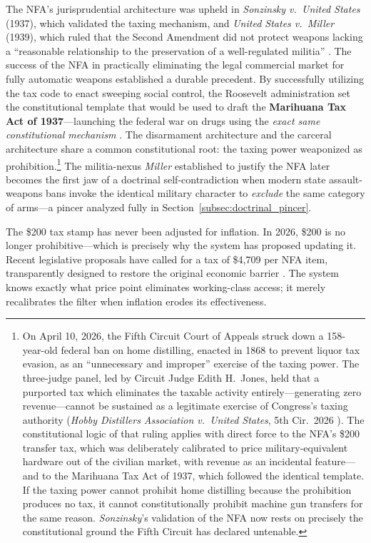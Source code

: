 The NFA's jurisprudential architecture was upheld in \textit{Sonzinsky v.\ United States} (1937), which validated the taxing mechanism, and \textit{United States v.\ Miller} (1939), which ruled that the Second Amendment did not protect weapons lacking a ``reasonable relationship to the preservation of a well-regulated militia'' \cite{dickinson_nfa, ebsco_nfa}. The success of the NFA in practically eliminating the legal commercial market for fully automatic weapons established a durable precedent. By successfully utilizing the tax code to enact sweeping social control, the Roosevelt administration set the constitutional template that would be used to draft the \textbf{Marihuana Tax Act of 1937}---launching the federal war on drugs using the \textit{exact same constitutional mechanism} \cite{cato_prohibition}. The disarmament architecture and the carceral architecture share a common constitutional root: the taxing power weaponized as prohibition.\footnote{On April 10, 2026, the Fifth Circuit Court of Appeals struck down a 158-year-old federal ban on home distilling, enacted in 1868 to prevent liquor tax evasion, as an ``unnecessary and improper'' exercise of the taxing power. The three-judge panel, led by Circuit Judge Edith H.\ Jones, held that a purported tax which eliminates the taxable activity entirely---generating zero revenue---cannot be sustained as a legitimate exercise of Congress's taxing authority (\textit{Hobby Distillers Association v.\ United States}, 5th Cir.\ 2026 \cite{hobby_distillers_2026}). The constitutional logic of that ruling applies with direct force to the NFA's \$200 transfer tax, which was deliberately calibrated to price military-equivalent hardware out of the civilian market, with revenue as an incidental feature---and to the Marihuana Tax Act of 1937, which followed the identical template. If the taxing power cannot prohibit home distilling because the prohibition produces no tax, it cannot constitutionally prohibit machine gun transfers for the same reason. \textit{Sonzinsky}'s validation of the NFA now rests on precisely the constitutional ground the Fifth Circuit has declared untenable.} The militia-nexus \textit{Miller} established to justify the NFA later becomes the first jaw of a doctrinal self-contradiction when modern state assault-weapons bans invoke the identical military character to \textit{exclude} the same category of arms---a pincer analyzed fully in Section~\ref{subsec:doctrinal_pincer}.

The \$200 tax stamp has never been adjusted for inflation. In 2026, \$200 is no longer prohibitive---which is precisely why the system has proposed updating it. Recent legislative proposals have called for a tax of \$4,709 per NFA item, transparently designed to restore the original economic barrier \cite{murphy2025nfa}. The system knows exactly what price point eliminates working-class access; it merely recalibrates the filter when inflation erodes its effectiveness.


